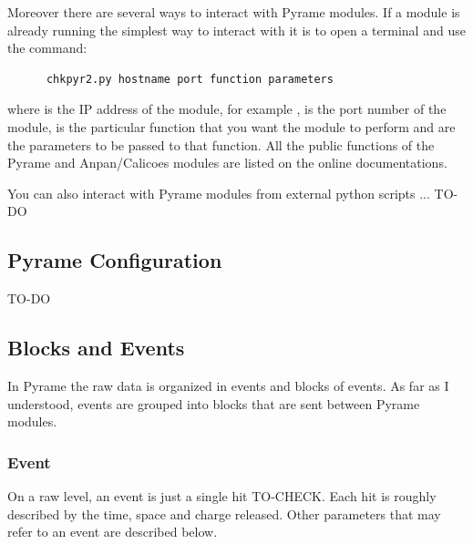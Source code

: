 Moreover there are several ways to interact with Pyrame modules. If a
module is already running the simplest way to interact with it is to
open a terminal and use the command:
\begin{lstlisting}
      chkpyr2.py hostname port function parameters
\end{lstlisting}
where  is the IP address of the module, for
example ,  is the port number
of the module,  is the particular function that
you want the module to perform and  are the
parameters to be passed to that function. All the public functions of
the Pyrame and Anpan/Calicoes modules are listed on the online
documentations.

You can also interact with Pyrame modules from external python scripts
... TO-DO

\subsection{Pyrame Configuration}\label{sec:pyrame-configuration}
TO-DO

\subsection{Blocks and Events}\label{sec:blocks-events}
In Pyrame the raw data is organized in events and blocks of events. As
far as I understood, events are grouped into blocks that are sent
between Pyrame modules.

\subsubsection{Event}
On a raw level, an event is just a single hit TO-CHECK. Each hit is
roughly described by the time, space and charge released. Other
parameters that may refer to an event are described below.

